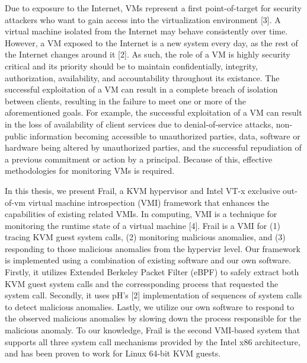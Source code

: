 \documentclass{report}
\begin{document}
\begin{spacing}{1.5}
{\large 
Due to exposure to the Internet, VMs represent a first point-of-target for security attackers who want to gain access into the virtualization environment [3]. A virtual machine isolated from the Internet may behave consistently over time. However, a VM exposed to the Internet is a new system every day, as the rest of the Internet changes around it [2]. As such, the role of a VM is highly security critical and its priority should be to maintain confidentially, integrity, authorization, availability, and accountability throughout its existance. The successful exploitation of a VM can result in a complete breach of isolation between clients, resulting in the failure to meet one or more of the aforementioned goals. For example, the successful exploitation of a VM can result in the loss of availability of client services due to denial-of-service attacks, non-public information becoming accessible to unauthorized parties, data, software or hardware being altered by unauthorized parties, and the successful repudiation of a previous commitment or action by a principal. Because of this, effective methodologies for monitoring VMs is required.
\newline
}

{\large 
In this thesis, we present Frail, a KVM hypervisor and Intel VT-x exclusive out-of-vm virtual machine introspection (VMI) framework that enhances the capabilities of existing related VMIs. In computing, VMI is a technique for monitoring the runtime state of a virtual machine [4]. Frail is a VMI for (1) tracing KVM guest system calls, (2) monitoring malicious anomalies, and (3) responding to those malicious anomalies from the hypervisr level. Our framework is implemented using a combination of existing software and our own software. Firstly, it utilizes Extended Berkeley Packet Filter (eBPF) to safely extract both KVM guest system calls and the corressponding process that requested the system call. Secondly, it uses pH's [2] implementation of sequences of system calls to detect malicious anomalies. Lastly, we utilize our own software to respond to the observed malicious anomalies by slowing down the process responsible for the malicious anomaly. To our knowledge, Frail is the second VMI-based system that supports all three system call mechanisms provided by the Intel x86 architecture, and has been proven to work for Linux 64-bit KVM guests.
\newline}

















\end{spacing}
\end{document}
